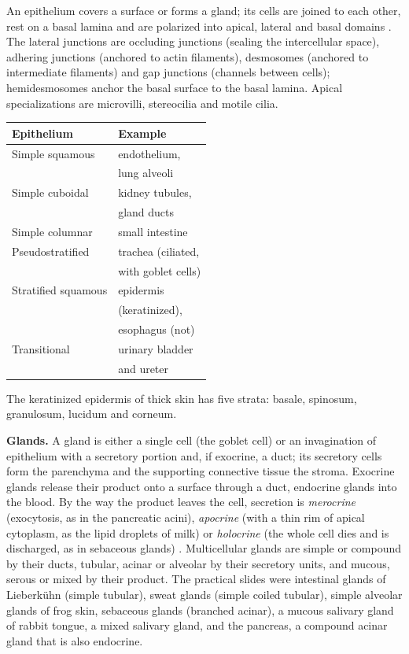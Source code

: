 An epithelium covers a surface or forms a
gland; its cells are joined to each other,
rest on a basal lamina and are polarized into
apical, lateral and basal domains
\cite[Chapter 5]{ross2011histology}. The
lateral junctions are occluding junctions
(sealing the intercellular space), adhering
junctions (anchored to actin filaments),
desmosomes (anchored to intermediate
filaments) and gap junctions (channels
between cells); hemidesmosomes anchor the
basal surface to the basal lamina. Apical
specializations are microvilli, stereocilia
and motile cilia.

\begin{center}
\begin{tabular}{ll}
Epithelium & Example \\
\hline
Simple squamous & endothelium, \\
& lung alveoli \\
Simple cuboidal & kidney tubules, \\
& gland ducts \\
Simple columnar & small intestine \\
Pseudostratified & trachea (ciliated, \\
& with goblet cells) \\
Stratified squamous & epidermis \\
& (keratinized), \\
& esophagus (not) \\
Transitional & urinary bladder \\
& and ureter \\
\end{tabular}
\end{center}

The keratinized epidermis of thick skin has
five strata: basale, spinosum, granulosum,
lucidum and corneum.

\textbf{Glands.} A gland is either a single
cell (the goblet cell) or an invagination of
epithelium with a secretory portion and, if
exocrine, a duct; its secretory cells form
the parenchyma and the supporting connective
tissue the stroma. Exocrine glands release
their product onto a surface through a duct,
endocrine glands into the blood. By the way
the product leaves the cell, secretion is
\emph{merocrine} (exocytosis, as in the
pancreatic acini), \emph{apocrine} (with a
thin rim of apical cytoplasm, as the lipid
droplets of milk) or \emph{holocrine} (the
whole cell dies and is discharged, as in
sebaceous glands) \cite[Chapter
5]{ross2011histology}. Multicellular glands
are simple or compound by their ducts,
tubular, acinar or alveolar by their
secretory units, and mucous, serous or mixed
by their product. The practical slides were
intestinal glands of Lieberk\"uhn (simple
tubular), sweat glands (simple coiled
tubular), simple alveolar glands of frog
skin, sebaceous glands (branched acinar), a
mucous salivary gland of rabbit tongue, a
mixed salivary gland, and the pancreas, a
compound acinar gland that is also endocrine.

